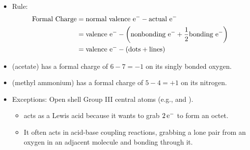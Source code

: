 \documentclass[../notes.tex]{subfiles}
\begin{document}
\begin{itemize}
\begin{itemize}
        \item Rule:
        \begin{align*}
            \text{Formal Charge} &= \text{normal valence }\e[-]-\text{actual }\e[-]\\
            &= \text{valence }\e[-]-\left( \text{nonbonding }\e[-]+\frac{1}{2}\text{bonding }\e[-] \right)\\
            &= \text{valence }\e[-]-(\text{dots}+\text{lines})
        \end{align*}
        \item {} (acetate) has a formal charge of $6-7=-1$ on its singly bonded oxygen.
        \item {} (methyl ammonium) has a formal charge of $5-4=+1$ on its nitrogen.
        \item Exceptions: Open shell Group III central atoms (e.g.,  and ).
        \begin{itemize}
            \item {} acts as a Lewis acid because it wants to grab $2\,\e[-]$ to form an octet.
            \item It often acts in acid-base coupling reactions, grabbing a lone pair from an oxygen in an adjacent molecule and bonding through it.
        \end{itemize}
    \end{itemize}
\end{itemize}
\end{document}
